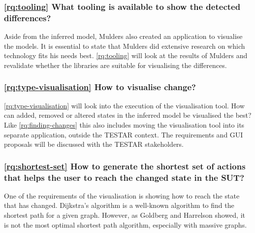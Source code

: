 \subsubsection{\ref{rq:tooling} What tooling is available to show the detected differences?}
Aside from the inferred model, Mulders also created an application to visualise the models. It is essential to state that Mulders did extensive research on which technology fits his needs best. \ref{rq:tooling} will look at the results of Mulders and revalidate whether the libraries are suitable for visualising the differences. 

\subsubsection{\ref{rq:type-visualisation} How to visualise change?}
\ref{rq:type-visualisation} will look into the execution of the visualisation tool. How can added, removed or altered states in the inferred model be visualised the best? Like \ref{rq:finding-changes} this also includes moving the visualisation tool into its separate application, outside the TESTAR context. The requirements and GUI proposals will be discussed with the TESTAR stakeholders. 

\subsubsection{\ref{rq:shortest-set} How to generate the shortest set of actions that helps the user to reach the changed state in the SUT?}
One of the requirements of the visualisation is showing how to reach the state that has changed. Dijkstra's algorithm \cite{dijkstra1959note} is a well-known algorithm to find the shortest path for a given graph. However, as Goldberg and Harrelson \cite{goldberg2005computing} showed, it is not the most optimal shortest path algorithm, especially with massive graphs. 